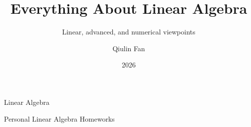 \documentclass{../toolchain/latex/qlnotes-native}
\title{Everything About Linear Algebra}
\subtitle{Linear, advanced, and numerical viewpoints}
\author{Qiulin Fan}
\date{2026}
\begin{document}
\frontmatter
\maketitle
\tableofcontents
\mainmatter


\clearpage

Linear Algebra



























\clearpage

Personal Linear Algebra Homeworks


















\end{document}
